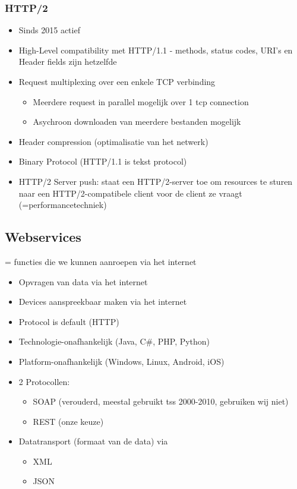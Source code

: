 \documentclass{article}
\begin{document}
\subsubsection{HTTP/2}

\begin{itemize}
    \item Sinds 2015 actief
    \item High-Level compatibility met HTTP/1.1 - methods, status codes, URI's en Header fields zijn hetzelfde
    \item Request multiplexing over een enkele TCP verbinding
    \begin{itemize}
        \item Meerdere request in parallel mogelijk over 1 tcp connection
        \item Asychroon downloaden van meerdere bestanden mogelijk
    \end{itemize}
    \item Header compression (optimalisatie van het netwerk)
    \item Binary Protocol (HTTP/1.1 is tekst protocol)
    \item HTTP/2 Server push: staat een HTTP/2-server toe om resources te sturen naar een HTTP/2-compatibele client voor de client ze vraagt (=performancetechniek)
\end{itemize}


\subsection{Webservices}
= functies die we kunnen aanroepen via het internet

\begin{itemize}
    \item Opvragen van data via het internet
    \item Devices aanspreekbaar maken via het internet
    \item Protocol is default (HTTP)
    \item Technologie-onafhankelijk (Java, C\#, PHP, Python)
    \item Platform-onafhankelijk (Windows, Linux, Android, iOS)
    \item 2 Protocollen:
    \begin{itemize}
        \item SOAP (verouderd, meestal gebruikt tss 2000-2010, gebruiken wij niet)
        \item REST (onze keuze)
    \end{itemize}
    \item Datatransport (formaat van de data) via
    \begin{itemize}
        \item XML
        \item JSON
    \end{itemize}
\end{itemize}
\end{document}
